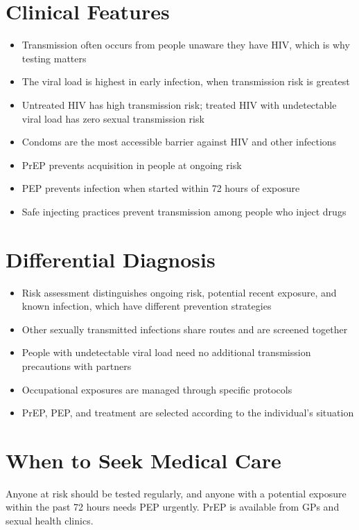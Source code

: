 \section*{Clinical Features}
\begin{itemize}
    \item Transmission often occurs from people unaware they have HIV, which is why testing matters
    \item The viral load is highest in early infection, when transmission risk is greatest
    \item Untreated HIV has high transmission risk; treated HIV with undetectable viral load has zero sexual transmission risk
    \item Condoms are the most accessible barrier against HIV and other infections
    \item PrEP prevents acquisition in people at ongoing risk
    \item PEP prevents infection when started within 72 hours of exposure
    \item Safe injecting practices prevent transmission among people who inject drugs
\end{itemize}

\section*{Differential Diagnosis}
\begin{itemize}
    \item Risk assessment distinguishes ongoing risk, potential recent exposure, and known infection, which have different prevention strategies
    \item Other sexually transmitted infections share routes and are screened together
    \item People with undetectable viral load need no additional transmission precautions with partners
    \item Occupational exposures are managed through specific protocols
    \item PrEP, PEP, and treatment are selected according to the individual's situation
\end{itemize}

\section*{When to Seek Medical Care}
Anyone at risk should be tested regularly, and anyone with a potential exposure within the past 72 hours needs PEP urgently. PrEP is available from GPs and sexual health clinics.

